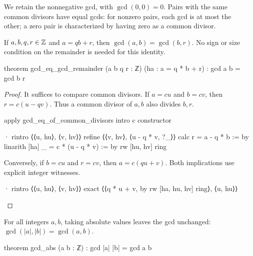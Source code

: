 We retain the nonnegative gcd, with $\gcd(0,0)=0$.
Pairs with the same common divisors have equal gcds: for nonzero pairs, each gcd is at most the
other; a zero pair is characterized by having zero as a common divisor.

\begin{lemma}
  \label{ent:thm:gcd-remainder}
  If $a,b,q,r\in\mathbb{Z}$ and $a=qb+r$, then $\gcd(a,b)=\gcd(b,r)$.
  No sign or size condition on the remainder is needed for this identity.

  \begin{lean}
    theorem gcd_eq_gcd_remainder (a b q r : ℤ) (ha : a = q * b + r) :
        gcd a b = gcd b r
  \end{lean}
\end{lemma}

\begin{proof}

  It suffices to compare common divisors.
  If $a=cu$ and $b=cv$, then $r=c(u-qv)$.
  Thus a common divisor of $a,b$ also divides $b,r$.

  \begin{lean}
    apply gcd_eq_of_common_divisors
    intro c
    constructor

    · rintro ⟨⟨u, hu⟩, ⟨v, hv⟩⟩
      refine ⟨⟨v, hv⟩, ⟨u - q * v, ?_⟩⟩
      calc
        r = a - q * b := by
          linarith [ha]
        _ = c * (u - q * v) := by
          rw [hu, hv]
          ring
  \end{lean}

  Conversely, if $b=cu$ and $r=cv$, then $a=c(qu+v)$.
  Both implications use explicit integer witnesses.

  \begin{lean}
    · rintro ⟨⟨u, hu⟩, ⟨v, hv⟩⟩
      exact ⟨⟨q * u + v, by
        rw [ha, hu, hv]
        ring⟩, ⟨u, hu⟩⟩
  \end{lean}

\end{proof}

\begin{lemma}
  \label{ent:thm:gcd-abs}
  For all integers $a,b$, taking absolute values leaves the gcd unchanged:
  $\gcd(|a|,|b|)=\gcd(a,b)$.

  \begin{lean}
    theorem gcd_abs (a b : ℤ) : gcd |a| |b| = gcd a b
  \end{lean}
\end{lemma}

